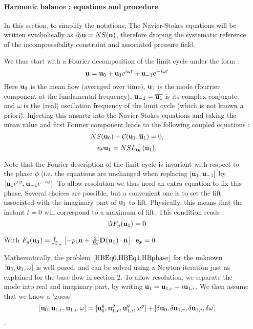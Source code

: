 \documentclass[twocolumn,10pt]{asme2ej}
\newcommand{\be}[1]{ \begin{equation} \label{#1}}
\newcommand{\ee}{\end{equation}}
\begin{document}
\paragraph{Harmonic balance : equations and procedure }

In this section, to simplify the notations, The Navier-Stokes equations will be written symbolically as 
$\partial_t  {\bf u }  = NS(  {\bf u } )$, therefore droping the systematic reference of the incompressibility constraint and associated pressure field.

We thus start with a Fourier decomposition of the limit cycle under the form :
\be{HB}
{\bf u } = {\bf u }_0 + {\bf u }_1 e^{i \omega t} +   {\bf u }_{-1} e^{-i \omega t}
\ee  
Here ${\bf u }_0$ is the mean flow (averaged over time),  ${\bf u }_1$ is the mode
(fourrier component at the fundamental frequency), ${\bf u }_{-1} = \overline{{\bf u }_1}$ is its complex conjugate, and $\omega$ is the (real) oscillation frequency of the limit cycle (which is not known a priori). Injecting this ansartz into the Navier-Stokes equations and taking the mean value and first Fourier component leads to the following coupled equations :
\be{HBEq0}
NS(  {\bf u }_0 ) - {\cal C}( {\bf u }_1, \overline{\bf u }_1) = 0,
\ee
\be{HBEq1}
i \omega {\bf u }_1 =  NSL_{{\bf u }_0}(  {\bf u }_1 ).
\ee

Note that the Fourier description of the limit cycle is invariant with respect to the phase $\phi$ (i.e. the equations are unchanged when replacing $[ {\bf u }_1,  {\bf u }_{-1}] $ by  $[ {\bf u }_1 e^{i\varphi},  {\bf u }_{-1}  e^{-i\varphi}] $. 
To allow resolution we thus need an extra equation to fix this phase. Several choices are possible, but a convenient one is to set the lift associated with the imaginary part of ${\bf u }_1$ to lift. Physically, this means that the instant $t=0$ will correspond to a maximum of lift. This condition reads :
\be{HBphase}
\Im F_y({\bf u}_1) =0
\ee

With $F_y ({\bf u_1}) = 
 \int_{\Gamma_w} \left[-p_1 {\bf n} + \frac{2}{Re} {\bf D}({\bf u_1}) \cdot {\bf n} \right]   \cdot {\bf e_y}  = 0.$


Mathematically, the problem $\ref{HBEq0,HBEq1,HBphase}$ for the unknown $[{\bf u }_0, {\bf u }_{1}, \omega]$ is well posed, and can be solved using a Newton iteration just as explained for the base flow in section 2. To allow resolution, we separate the mode into real and imaginary part, by writing ${\bf u }_1 = {\bf u }_{1,r} +  i {\bf u }_{1,i} $.
We then assume that we know a 'guess' 
$$
[{\bf u }_0, {\bf u }_{1,r}, {\bf u }_{1,i}, \omega] = 
 [{\bf u }_0^g, {\bf u }_{1,r}^g, {\bf u }_{1,i}^g, \omega^g]
+ [\delta {\bf u }_0, \delta {\bf u }_{1,r}, \delta {\bf u }_{1,i}, \delta \omega]
$$.
\end{document}
